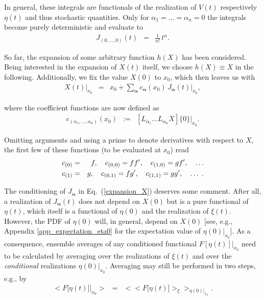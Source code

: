 \documentclass[aps,twocolumn,superscriptaddress,showpacs,showkeys]{revtex4}
\newcommand{\vecalpha}{{\boldsymbol{\alpha}}}
\begin{document}
\noindent In general, these integrals are functionals of the realization of $V(t)$ respectively $\eta(t)$ and thus stochastic
quantities. Only for $\alpha_1=\ldots=\alpha_n=0$ the integrals become purely deterministic and evaluate to
%
\begin{eqnarray}\label{J_deterministic}
J_{(0,\ldots,0)}(t) &=& \frac{1}{n!}\,t^n.
\end{eqnarray}

\noindent So far, the expansion of some arbitrary function $h(X)$ has been considered. Being interested in the
expansion of $X(t)$ itself, we choose $h(X)\equiv X$ in the following. Additionally, we fix the value $X(0)$ to
$x_0$, which then leaves us with
%
\begin{eqnarray}\label{expansion_X}
X(t)\big|_{x_0} &=& x_0 +\sum_\vecalpha c_\vecalpha(x_0)\, J_\vecalpha(t)\big|_{x_0},
\end{eqnarray}

\noindent where the coefficient functions are now defined as
%
\begin{eqnarray}\label{def_c_alpha}
c_{(\alpha_1,\ldots,\alpha_n)}(x_0) &:=& [L_{\alpha_1}\ldots L_{\alpha_n} X]\{0\}\big|_{x_0}.
\end{eqnarray}

\noindent Omitting arguments and using a prime to denote derivatives with respect to  $X$, the first few of
these functions (to be evaluated at $x_0$) read
%
\begin{eqnarray}
c_{(0)} &=&  f,\quad c_{(0,0)} = ff',\quad c_{(1,0)} = gf',\quad \ldots \cr
c_{(1)} &=&  g,\quad c_{(0,1)} = fg',\quad c_{(1,1)} = gg',\quad \ldots \;.
\end{eqnarray}

\noindent The conditioning of $J_\vecalpha$ in Eq.~(\ref{expansion_X}) deserves some comment. After all, a realization
of $J_\vecalpha(t)$ does not depend on $X(0)$ but is a pure functional of $\eta(t)$, which itself is a functional of
$\eta(0)$ and the realization of $\xi(t)$.
However, the PDF of $\eta(0)$ will, in general, depend on $X(0)$ [see, e.g., Appendix \ref{app_expectation_eta0} for the
expectation value of $\eta(0)|_{x_0}$].
As a consequence, ensemble averages of any conditioned functional $F[\eta(t)]|_{x_0}$ need to be calculated by averaging
over the realizations of $\xi(t)$ and over the {\em conditional} realizations $\eta(0)|_{x_0}$. Averaging may still be
performed in two steps, e.g., by
%
\begin{eqnarray}\label{ave_func_eta_x}
\Big<F\big[\eta(t)\big]\big|_{x_0}\Big> &=& \Big<\Big<F\big[\eta(t)\big]\Big>_\xi\Big>_{\eta(0)|_{x_0}}.
\end{eqnarray}
\end{document}
